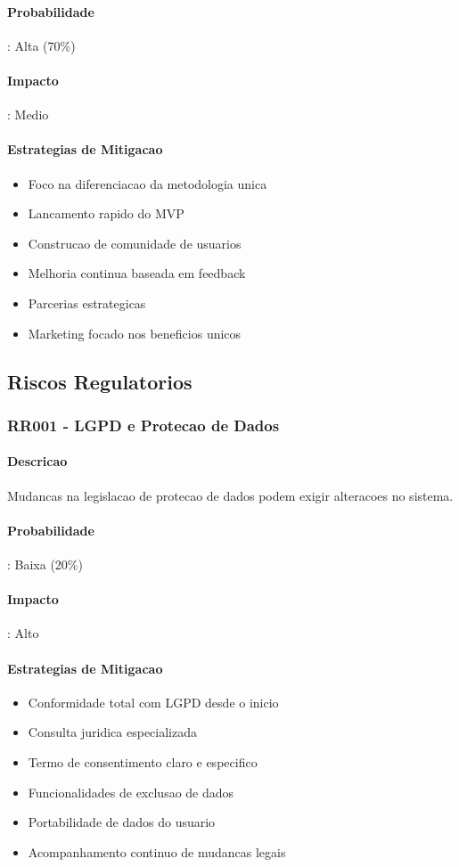 \paragraph{Probabilidade}: Alta (70\%)
\paragraph{Impacto}: Medio

\paragraph{Estrategias de Mitigacao}
\begin{itemize}
    \item Foco na diferenciacao da metodologia unica
    \item Lancamento rapido do MVP
    \item Construcao de comunidade de usuarios
    \item Melhoria continua baseada em feedback
    \item Parcerias estrategicas
    \item Marketing focado nos beneficios unicos
\end{itemize}

\subsection{Riscos Regulatorios}

\subsubsection{RR001 - LGPD e Protecao de Dados}

\paragraph{Descricao}
Mudancas na legislacao de protecao de dados podem exigir alteracoes no sistema.

\paragraph{Probabilidade}: Baixa (20\%)
\paragraph{Impacto}: Alto

\paragraph{Estrategias de Mitigacao}
\begin{itemize}
    \item Conformidade total com LGPD desde o inicio
    \item Consulta juridica especializada
    \item Termo de consentimento claro e especifico
    \item Funcionalidades de exclusao de dados
    \item Portabilidade de dados do usuario
    \item Acompanhamento continuo de mudancas legais
\end{itemize}

